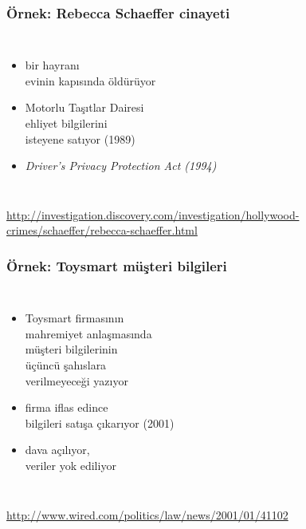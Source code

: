 \documentclass[dvipsnames]{beamer}
\theoremstyle{definition}
\theoremstyle{example}
\theoremstyle{plain}
\begin{document}
\begin{frame}
  \frametitle{Örnek: Rebecca Schaeffer cinayeti}

  \begin{columns}

    \begin{itemize}
      \item bir hayranı\\
        evinin kapısında öldürüyor
      \item Motorlu Taşıtlar Dairesi\\
        ehliyet bilgilerini\\
        isteyene satıyor (1989)

      \medskip
      \item \emph{Driver's Privacy Protection Act (1994)}
    \end{itemize}
  \end{columns}

  \medskip
  \tiny{\url{http://investigation.discovery.com/investigation/hollywood-crimes/schaeffer/rebecca-schaeffer.html}}\\
\end{frame}

\begin{frame}
  \frametitle{Örnek: Toysmart müşteri bilgileri}

  \begin{columns}

    \begin{itemize}
      \item Toysmart firmasının\\
        mahremiyet anlaşmasında\\
        müşteri bilgilerinin\\
        üçüncü şahıslara\\
        verilmeyeceği yazıyor
      \item firma iflas edince\\bilgileri satışa çıkarıyor (2001)
      \item dava açılıyor,\\
        veriler yok ediliyor
    \end{itemize}
  \end{columns}

  \medskip
  \tiny{\url{http://www.wired.com/politics/law/news/2001/01/41102}}\\
\end{frame}
\end{document}
